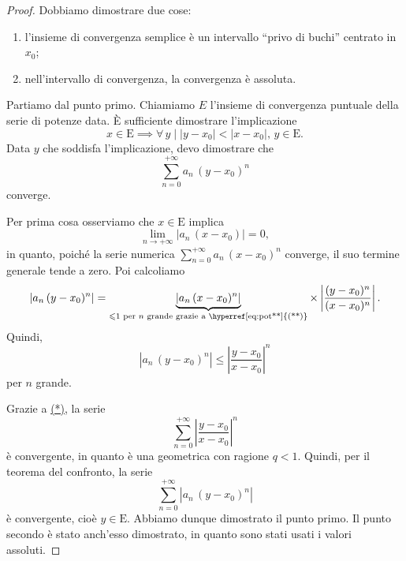\documentclass[../../analisi2]{subfiles}
\begin{document}
        \begin{proof}
            Dobbiamo dimostrare due cose:
            \begin{enumerate}
                \item l'insieme di convergenza semplice è un intervallo ``privo di buchi'' centrato in \(x_0\);
                \item nell'intervallo di convergenza, la convergenza è assoluta.
            \end{enumerate}

            Partiamo dal punto primo. Chiamiamo \(E\) l'insieme di convergenza puntuale della serie di potenze data. È sufficiente
            dimostrare l'implicazione
            \begin{equation}
                x \in \mathrm{E} \implies \forall \, y \; | \; |y - x_0| < |x - x_0|, \, y \in \mathrm{E}. \tag{*}\label{eq:pot*}
            \end{equation}
            Data \(y\) che soddisfa l'implicazione, devo dimostrare che
            \[
                \sum_{n = 0}^{+\infty} a_n \, (y - x_0)^n
            \]
            converge.

            Per prima cosa osserviamo che \(x \in \mathrm{E}\) implica
            \begin{equation}
                \lim_{n \to +\infty} |a_n \, (x - x_0)| = 0, \tag{**}\label{eq:pot**}
            \end{equation}
            in quanto, poiché la serie numerica \(\sum_{n = 0}^{+\infty} a_n \, (x - x_0)^n\) converge, il suo termine generale tende a
            zero. Poi calcoliamo
            \[
                \left|a_n \, (y - x_0)^n\right| = \underbrace{\left|a_n \, (x - x_0)^n\right|}_{\leqslant 1 \text{ per } n \text{ grande
                grazie a \hyperref[eq:pot**]{(**)}}} \times \left|\frac{(y - x_0)^n}{(x - x_0)^n}\right|.
            \]
            Quindi,
            \[
                \left|a_n \, (y - x_0)^n\right| \leqslant \left|\frac{y - x_0}{x - x_0}\right|^n
            \]
            per \(n\) grande.

            Grazie a \hyperref[eq:pot*]{(*)}, la serie
            \[
                \sum_{n = 0}^{+\infty} \left|\frac{y - x_0}{x - x_0}\right|^n
            \]
            è convergente, in quanto è una geometrica con ragione \(q < 1\). Quindi, per il teorema del confronto, la serie
            \[
                \sum_{n = 0}^{+\infty} \left|a_n \, (y - x_0)^n\right|
            \]
            è convergente, cioè \(y \in \mathrm{E}\). Abbiamo dunque dimostrato il punto primo. Il punto secondo è stato anch'esso
            dimostrato, in quanto sono stati usati i valori assoluti.
        \end{proof}
\end{document}
